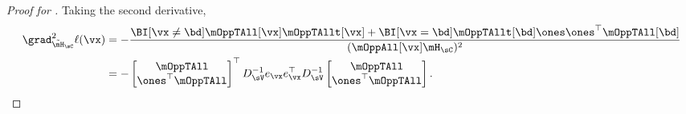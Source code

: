 \begin{proof}[Proof for ]
Taking the second derivative,
\begin{align}
  \grad^2_{\tilde \mH_\sC} \ell(\vx)
  &= - \frac{\BI[\vx \neq \bd] \mOppTAll[\vx] \mOppTAllt[\vx] + \BI[\vx = \bd] \mOppTAllt[\bd] \ones \ones^\top \mOppTAll[\bd]}{(\mOppAll[\vx] \mH_\sC)^2} \nonumber \\
  &= - 
  \begin{bmatrix}
    \mOppTAll \\
    \ones^\top \mOppTAll
  \end{bmatrix}^\top
    D_{\sV}^{-1} e_\vx e_\vx^\top D_{\sV}^{-1} 
  \begin{bmatrix}
    \mOppTAll \\
    \ones^\top \mOppTAll
  \end{bmatrix}. \label{eqn:lhood-hess}%
\end{align}


\end{proof}
